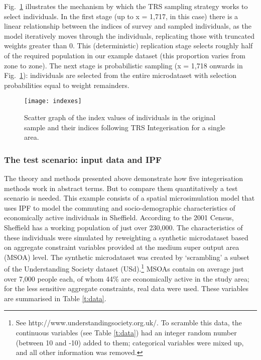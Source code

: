 Fig.~\ref{fig:index-TRS} illustrates the mechanism by which the TRS sampling
strategy works to select individuals. In the first stage (up to x = 1,717,
in this case) there is a linear
relationship between the indices of survey and sampled individuals, as the
model iteratively moves through the individuals, replicating those with
truncated weights greater than 0. This
(deterministic) replication stage selects roughly half of the required
population
in our example dataset (this proportion varies from zone to zone).
The next stage is probabilistic sampling
(x = 1,718 onwards in Fig.~\ref{fig:index-TRS}): individuals are selected from
the entire microdataset with selection probabilities equal to weight remainders.


\begin{figure}[h]
 \centerline{
 \texttt{[image: indexes]}}
 \caption[Scatter graph of the index values of individuals]{Scatter graph of the
index values of individuals in the original sample and their indices following
TRS Integerisation for a single area. }
 \label{fig:index-TRS}
\end{figure}

\subsubsection{The test scenario: input data and IPF}
\label{worked-eg}
The theory and methods presented above demonstrate how five integerisation
methods work in abstract terms. But to compare them quantitatively a test
scenario is needed. This example consists of a spatial microsimulation model
that uses IPF to model the commuting and socio-demographic characteristics
of economically active individuals in
Sheffield. According to the 2001 Census, Sheffield has a working
population of just over 230,000. The characteristics of these
individuals were simulated by reweighting a synthetic microdataset based on
aggregate constraint variables provided at the medium super output area (MSOA)
level. The synthetic microdataset was created by `scrambling' a subset of the
Understanding Society dataset (USd).\footnote{See
http://www.understandingsociety.org.uk/. To scramble this data, the continuous
variables (see Table \ref{t:data}) had an integer random number (between 10 and
-10) added to them; categorical variables were mixed up, and all other
information was removed.} MSOAs
contain on average
just over 7,000 people each, of whom 44\% are economically active
in the study area; for the less sensitive aggregate constraints, real data were
used. These variables are summarised in Table \ref{t:data}.

